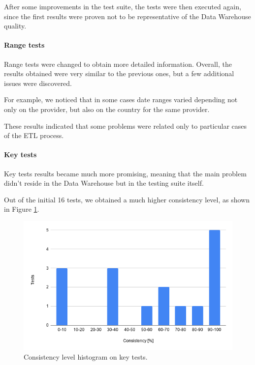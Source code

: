 After some improvements in the test suite, the tests were then executed again, since the first results were proven not to be representative of the Data Warehouse quality.

\paragraph{Range tests}
    Range tests were changed to obtain more detailed information.
    Overall, the results obtained were very similar to the previous ones, but a few additional issues were discovered.
    
    For example, we noticed that in some cases date ranges varied depending not only on the provider, but also on the country for the same provider.
    
    These results indicated that some problems were related only to particular cases of the ETL process.

\paragraph{Key tests}
    Key tests results became much more promising, meaning that the main problem didn't reside in the Data Warehouse but in the testing suite itself.
    
    Out of the initial 16 tests, we obtained a much higher consistency level, as shown in Figure \ref{fig:tests:data:hist_1}.
    
    \begin{figure}
        \centering
        \includegraphics[width=\textwidth]{res/tests/data_hist_1.png}
        \caption{Consistency level histogram on key tests.}
        \label{fig:tests:data:hist_1}
    \end{figure}
    
